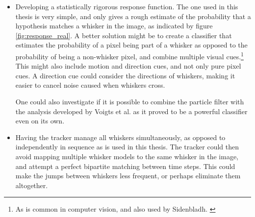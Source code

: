 \begin{itemize}
\item Developing a statistically rigorous response function. The one
  used in this thesis is very simple, and only gives a rough estimate
  of the probability that a hypothesis matches a whisker in the image,
  as indicated by figure \ref{fig:response_real}. A better solution
  might be to create a classifier that estimates the probability of a
  pixel being part of a whisker as opposed to the probability of being
  a non-whisker pixel, and combine multiple visual cues.\footnote{As
    is common in computer vision, and also used by
    Sidenbladh. \cite{Hedvig}} This might also include motion and
  direction cues, and not only pure pixel cues. A direction cue could
  consider the directions of whiskers, making it easier to cancel
  noise caused when whiskers cross.

  One could also investigate if it is possible to combine the particle
  filter with the analysis developed by Voigts et
  al. \cite{UnsupervisedTracking} as it proved to be a powerful
  classifier even on its own.

\item Having the tracker manage all whiskers simultaneously, as
  opposed to independently in sequence as is used in this thesis. The
  tracker could then avoid mapping multiple whisker models to the same
  whisker in the image, and attempt a perfect bipartite matching
  between time steps. This could make the jumps between whiskers less
  frequent, or perhaps eliminate them altogether.

\end{itemize}




%
%


